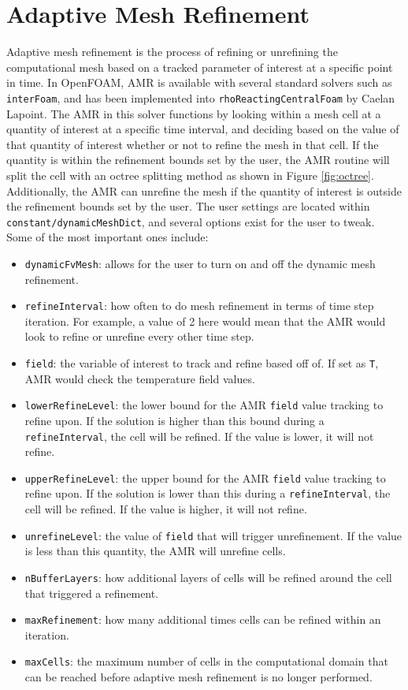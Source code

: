\section{Adaptive Mesh Refinement}

Adaptive mesh refinement is the process of refining or unrefining the computational mesh based on a tracked parameter of interest at a specific point in time. In OpenFOAM, AMR is available with several standard solvers such as \verb|interFoam|, and has been implemented into \verb|rhoReactingCentralFoam| by Caelan Lapoint. The AMR in this solver functions by looking within a mesh cell at a quantity of interest at a specific time interval, and deciding based on the value of that quantity of interest whether or not to refine the mesh in that cell. If the quantity is within the refinement bounds set by the user, the AMR routine will split the cell with an octree splitting method as shown in Figure \ref{fig:octree}. Additionally, the AMR can unrefine the mesh if the quantity of interest is outside the refinement bounds set by the user. The user settings are located within \verb|constant/dynamicMeshDict|, and several options exist for the user to tweak. Some of the most important ones include:
\begin{itemize}
\item \verb|dynamicFvMesh|: allows for the user to turn on and off the dynamic mesh refinement. 
\item \verb|refineInterval|: how often to do mesh refinement in terms of time step iteration. For example, a value of 2 here would mean that the AMR would look to refine or unrefine every other time step. 
\item \verb|field|: the variable of interest to track and refine based off of. If set as \verb|T|, AMR would check the temperature field values.  
\item \verb|lowerRefineLevel|: the lower bound for the AMR \verb|field| value tracking to refine upon. If the solution is higher than this bound during a \verb|refineInterval|, the cell will be refined. If the value is lower, it will not refine. 
\item \verb|upperRefineLevel|: the upper bound for the AMR \verb|field| value tracking to refine upon. If the solution is lower than this during a \verb|refineInterval|, the cell will be refined. If the value is higher, it will not refine. 
\item \verb|unrefineLevel|: the value of \verb|field| that will trigger unrefinement. If the value is less than this quantity, the AMR will unrefine cells. 
\item \verb|nBufferLayers|: how additional layers of cells will be refined around the cell that triggered a refinement. 
\item \verb|maxRefinement|: how many additional times cells can be refined within an iteration. 
\item \verb|maxCells|: the maximum number of cells in the computational domain that can be reached before adaptive mesh refinement is no longer performed. 
\end{itemize}
